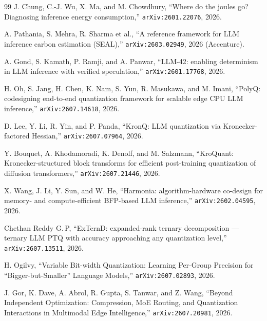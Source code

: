 \documentclass[11pt,a4paper]{article}
\theoremstyle{plain}
\begin{document}
\begin{thebibliography}{99}
 J. Chung, C.-J. Wu, X. Ma, and M. Chowdhury, ``Where do the
joules go? Diagnosing inference energy consumption,'' \texttt{arXiv:2601.22076},
2026.

 A. Pathania, S. Mehra, R. Sharma et al., ``A reference
framework for LLM inference carbon estimation (SEAL),'' \texttt{arXiv:2603.02949},
2026 (Accenture).

 A. Gond, S. Kamath, P. Ramji, and A. Panwar, ``LLM-42:
enabling determinism in LLM inference with verified speculation,''
\texttt{arXiv:2601.17768}, 2026.

 H. Oh, S. Jang, H. Chen, K. Nam, S. Yun, R. Masukawa, and
M. Imani, ``PolyQ: codesigning end-to-end quantization framework for scalable
edge CPU LLM inference,'' \texttt{arXiv:2607.14618}, 2026.

 D. Lee, Y. Li, R. Yin, and P. Panda, ``KronQ: LLM
quantization via Kronecker-factored Hessian,'' \texttt{arXiv:2607.07964}, 2026.

 Y. Bouquet, A. Khodamoradi, K. Denolf, and M. Salzmann,
``KroQuant: Kronecker-structured block transforms for efficient post-training
quantization of diffusion transformers,'' \texttt{arXiv:2607.21446}, 2026.

 X. Wang, J. Li, Y. Sun, and W. He, ``Harmonia:
algorithm-hardware co-design for memory- and compute-efficient BFP-based LLM
inference,'' \texttt{arXiv:2602.04595}, 2026.

 Chethan Reddy G.\,P, ``ExTernD: expanded-rank ternary
decomposition --- ternary LLM PTQ with accuracy approaching any quantization
level,'' \texttt{arXiv:2607.13511}, 2026.

 H. Ogilvy, ``Variable Bit-width Quantization: Learning
Per-Group Precision for ``Bigger-but-Smaller'' Language Models,''
\texttt{arXiv:2607.02893}, 2026.

 J. Gor, K. Dave, A. Abrol, R. Gupta, S. Tanwar, and
Z. Wang, ``Beyond Independent Optimization: Compression, MoE Routing, and
Quantization Interactions in Multimodal Edge Intelligence,''
\texttt{arXiv:2607.20981}, 2026.

\end{thebibliography}
\end{document}
